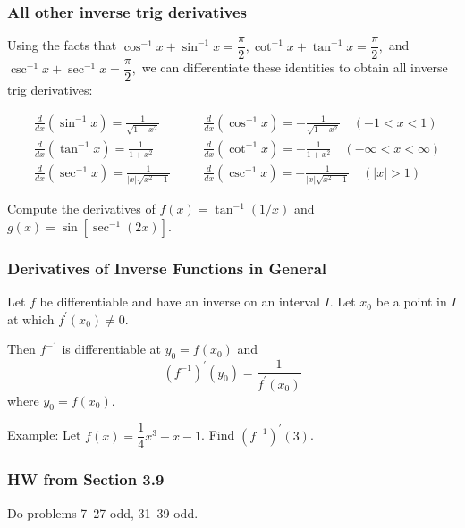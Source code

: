 \documentclass[14pt]{beamer}
\begin{document}
\begin{frame}

\frametitle{All other inverse trig derivatives}

Using the facts that $\cos^{-1}x+\sin^{-1}x=\dfrac{\pi}{2}, \cot^{-1}x+\tan^{-1}x=\dfrac{\pi}{2},$ and $\csc^{-1}x+\sec^{-1}x=\dfrac{\pi}{2},$ we can differentiate these identities to obtain all inverse trig derivatives:

\begin{align*}
&\frac{d}{dx}(\sin^{-1}x)=\frac{1}{\sqrt{1-x^2}}&\quad &\frac{d}{dx}(\cos^{-1}x)=-\frac{1}{\sqrt{1-x^2}}\quad (-1<x<1) \\
&\frac{d}{dx}(\tan^{-1}x)=\frac{1}{1+x^2}&\quad &\frac{d}{dx}(\cot^{-1}x)=-\frac{1}{1+x^2}\quad (-\infty<x<\infty) \\
&\frac{d}{dx}(\sec^{-1}x)=\frac{1}{|x|\sqrt{x^2-1}}&\quad &\frac{d}{dx}(\csc^{-1}x)=-\frac{1}{|x|\sqrt{x^2-1}}\quad (|x|>1)
\end{align*}

\end{frame}

\begin{frame}[t]

Compute the derivatives of $f(x)=\tan^{-1}(1/x)$ and $g(x)=\sin \left[\sec^{-1}(2x) \right]$.

\end{frame}

\begin{frame}[t]

\frametitle{Derivatives of Inverse Functions in General}

Let $f$ be differentiable and have an inverse on an interval $I$.  Let $x_0$ be a point in $I$ at which $f^{\prime}(x_0)\ne0$.

\bigskip

Then $f^{-1}$ is differentiable at $y_0=f(x_0)$ and 
$$\left(f^{-1}\right)^{\prime}(y_0)=\frac{1}{f^{\prime}(x_0)}$$
where $y_0=f(x_0).$

\bigskip

Example:  Let $f(x)=\dfrac{1}{4}x^3+x-1$.  Find $\left(f^{-1}\right)^{\prime}(3)$.

\end{frame}

\begin{frame}

\frametitle{HW from Section 3.9}

Do problems 7--27 odd, 31--39 odd.

\end{frame}
\begin{comment}
\end{comment}
\end{document}
